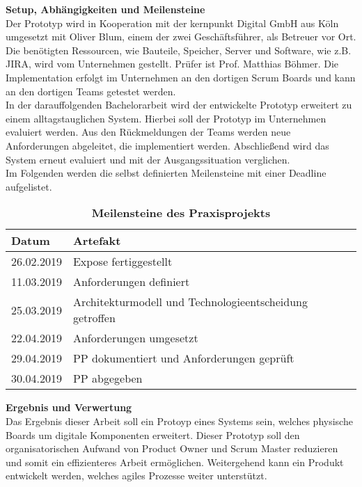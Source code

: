 \documentclass[12pt,titlepage]{scrartcl}
\begin{document}
\textbf{Setup, Abhängigkeiten und Meilensteine} \\
Der Prototyp wird in Kooperation mit der kernpunkt Digital GmbH aus Köln umgesetzt mit Oliver Blum, einem der zwei Geschäftsführer, als Betreuer vor Ort. Die benötigten Ressourcen, wie Bauteile, Speicher, Server und Software, wie z.B. JIRA, wird vom Unternehmen gestellt. Prüfer ist Prof. Matthias Böhmer. Die Implementation erfolgt im Unternehmen an den dortigen Scrum Boards und kann an den dortigen Teams getestet werden. \\
In der darauffolgenden Bachelorarbeit wird der entwickelte Prototyp erweitert zu einem alltagstauglichen System. Hierbei soll der Prototyp im Unternehmen evaluiert werden. Aus den Rückmeldungen der Teams werden neue Anforderungen abgeleitet, die implementiert werden. Abschließend wird das System erneut evaluiert und mit der Ausgangssituation verglichen. \\
Im Folgenden werden die selbst definierten Meilensteine mit einer Deadline aufgelistet.
\begin{table}[H]
\centering
\caption{\textbf{Meilensteine des Praxisprojekts}}
\begin{tabular}{|c|l|}
\hline
\multicolumn{1}{|l|}{\textbf{Datum}} & {\textbf{Artefakt}} \\ \hline
26.02.2019                                 & Expose fertiggestellt \\ \hline
11.03.2019                                 & Anforderungen definiert\\ \hline
25.03.2019                                       & Architekturmodell und Technologieentscheidung getroffen \\ \hline
22.04.2019                                       & Anforderungen umgesetzt                                  \\ \hline
29.04.2019                                       & PP dokumentiert und Anforderungen geprüft                                \\ \hline
30.04.2019                                       & PP abgegeben\\ \hline
\end{tabular}
\end{table}
\newpage
\noindent \textbf{Ergebnis und Verwertung} \\
Das Ergebnis dieser Arbeit soll ein Protoyp eines Systems sein, welches physische Boards um digitale Komponenten erweitert. Dieser Prototyp soll den organisatorischen Aufwand von Product Owner und Scrum Master reduzieren und somit ein effizienteres Arbeit ermöglichen. Weitergehend kann ein Produkt entwickelt werden, welches agiles Prozesse weiter unterstützt. 
\end{document}
